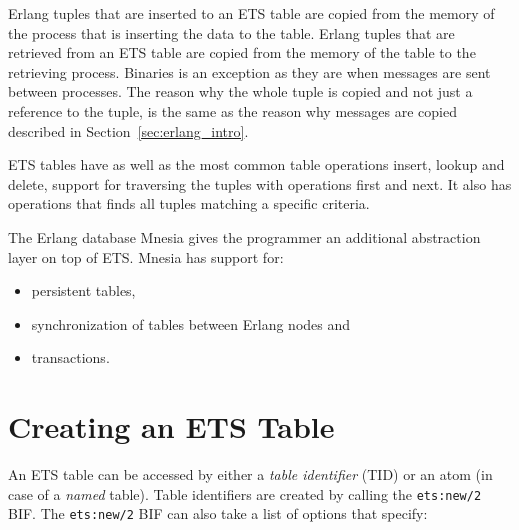 \documentclass[aps,pre,preprint,nofootinbib]{revtex4}
\begin{document}
Erlang tuples that are inserted to an ETS table are copied from the memory of the process that is inserting the data to the table.
Erlang tuples that are retrieved from an ETS table are copied from the memory of the table to the retrieving process.
Binaries is an exception as they are when messages are sent between processes.
The reason why the whole tuple is copied and not just a reference to the tuple, is the same as the reason why messages are copied described in Section~\ref{sec:erlang_intro}.

ETS tables have as well as the most common table operations insert, lookup and delete, support for traversing the tuples with operations first and next.
It also has operations that finds all tuples matching a specific criteria.

The Erlang database Mnesia gives the programmer an additional abstraction layer on top of ETS. 
Mnesia has support for:
\begin{itemize}
 \item persistent tables,
 \item synchronization of tables between Erlang nodes and
 \item transactions.
\end{itemize}

\section{Creating an ETS Table}

An ETS table can be accessed by either a \emph{table identifier} (TID) or an atom (in case of a \emph{named} table).
Table identifiers are created by calling the \verb|ets:new/2| BIF.
The \verb|ets:new/2| BIF can also take a list of options that specify:
\end{document}
